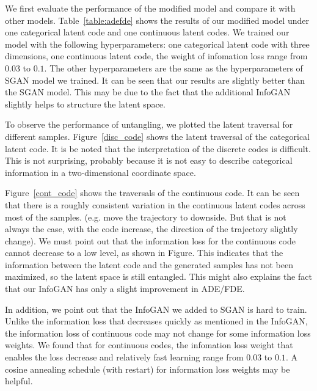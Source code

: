 We first evaluate the performance of the modified model and compare it with other models. Table~\ref{table:adefde} shows the results of our modified model under one categorical latent code and one continuous latent codes. We trained our model with the following hyperparameters: one categorical latent code with three dimensions, one continuous latent code, the weight of infomation loss range from $0.03$ to $0.1$. The other hyperparameters are the same as the hyperparameters of SGAN model we trained. It can be seen that our results are slightly better than the SGAN model. This may be due to the fact that the additional InfoGAN slightly helps to structure the latent space.


To observe the performance of untangling, we plotted the latent traversal for different samples. Figure~\ref{disc_code} shows the latent traversal of the categorical latent code. It is be noted that the interpretation of the discrete codes is difficult. This is not surprising, probably because it is not easy to describe categorical information in a two-dimensional coordinate space.

Figure~\ref{cont_code} shows the traversals of the continuous code. It can be seen that there is a roughly consistent variation in the continuous latent codes across most of the samples. (e.g. move the trajectory to downside. But that is not always the case, with the code increase, the direction of the trajectory slightly change). We must point out that the information loss for the continuous code cannot decrease to a low level, as shown in Figure. This indicates that the information between the latent code and the generated samples has not been maximized, so the latent space is still entangled. This might also explains the fact that our InfoGAN has only a slight improvement in ADE/FDE.


In addition, we point out that the InfoGAN we added to SGAN is hard to train. Unlike the information loss that decreases quickly as mentioned in the InfoGAN, the information loss of continuous code may not change for some information loss weights. We found that for continuous codes, the infomation loss weight that enables the loss decrease and relatively fast learning  range from $0.03$ to $0.1$. A cosine annealing schedule (with restart) for information loss weights may be helpful.

